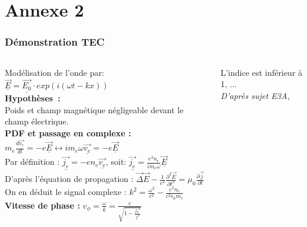 \documentclass[xcolor=dvipsnames,envcountsect]{beamer}
\begin{document}
\section{Annexe 2}
\begin{frame}
	\label{appendix:2}
	\frametitle{Démonstration TEC}

	\begin{columns}
		\begin{column}{0.5\textwidth}
			{\small Modélisation de l'onde par: $\vec{\underline{E}} = \vec{\underline{E_0}} \cdot exp(i(\omega t - kx))$ \\
			\textbf{Hypothèses :} \\ Poids et champ magnétique négligeable devant le champ électrique.\\ 
			\textbf{PDF et passage en complexe :} $m_e \frac{d \vec{\underline{v_e}}}{dt} = -e \vec{\underline{E}} \leftrightarrow i m_e \omega \vec{\underline{v_e}} = -e \vec{\underline{E}}$
			\\ Par définition : $\vec{\underline{j_e}}= -e n_e \vec{\underline{v_e}}$, soit: $\vec{\underline{j_e}} = \frac{e^2 n_e}{i m_e \omega} \vec{\underline{E}}$ \\
			D'après l'équation de propagation : $\vec{\Delta} \vec E - \frac{1}{c^2} \frac{\partial^2 \vec E}{\partial t^2} = \mu_0 \frac{\partial \vec j}{\partial t}$ \\
			On en déduit le signal complexe : $k^2 = \frac{\omega^2}{c^2} - \frac{e^2 n_e}{c^2 \epsilon_0 m_e}$ \\
			\textbf{Vitesse de phase :} $v_{\phi} = \frac{\omega}{k} = \frac{c}{\sqrt{1 - \frac{{f_p}^2}{f^2}}}$ \\
			
			}
			\end{column}

		\begin{column}{0.5\textwidth}
			\begin{flushright}
				L'indice est inférieur à 1, ... \\
				{\tiny \textit{D'après sujet E3A, \cite{e3a}}}
			\end{flushright}
		\end{column}
	\end{columns}
\end{frame}
\end{document}
